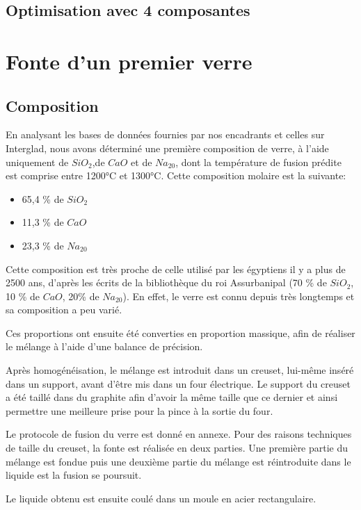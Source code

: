 \documentclass{article}
\begin{document}
\subsection{Optimisation avec 4 composantes}

\section{Fonte d'un premier verre}

\subsection{Composition}

En analysant les bases de données fournies par nos encadrants et celles sur Interglad, nous avons déterminé une première composition de verre, à l'aide uniquement de $SiO_2$,de $CaO$ et de $Na_20$, dont la température de fusion prédite est comprise entre 1200°C et 1300°C. Cette composition molaire est la suivante:

\begin{itemize}
    \item 65,4 \% de $SiO_2$
    \item 11,3 \% de $CaO$
    \item 23,3 \% de $Na_20$
\end{itemize}

Cette composition est très proche de celle utilisé par les égyptiens il y a plus de 2500 ans, d’après les écrits de la bibliothèque du roi Assurbanipal (70 \% de $SiO_2$, 10 \% de $CaO$, 20\% de $Na_20$). En effet, le verre est connu depuis très longtemps et sa composition a peu varié. 

Ces proportions ont ensuite été converties en proportion massique, afin de réaliser le mélange à l’aide d’une balance de précision. 

Après homogénéisation, le mélange est introduit dans un creuset, lui-même inséré dans un support, avant d’être mis dans un four électrique. Le support du creuset a été taillé dans du graphite afin d’avoir la même taille que ce dernier et ainsi permettre une meilleure prise pour la pince à la sortie du four.

Le protocole de fusion du verre est donné en annexe. Pour des raisons techniques de taille du creuset, la fonte est réalisée en deux parties. Une première partie du mélange est fondue puis une deuxième partie du mélange est réintroduite dans le liquide est la fusion se poursuit.

Le liquide obtenu est ensuite coulé dans un moule en acier rectangulaire.
\end{document}
